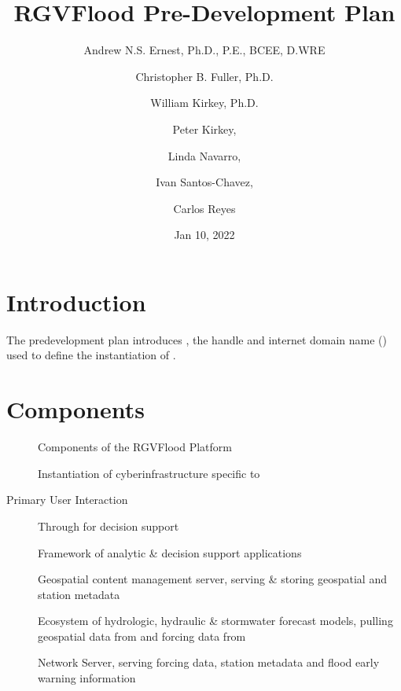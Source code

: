 \documentclass[letterpaper,12pt,english]{sphinxmanual}
\title{RGVFlood Pre-Development Plan}
\date{Jan 10, 2022}
\author{Andrew N.S. Ernest, Ph.D., P.E., BCEE, D.WRE \and Christopher B. Fuller, Ph.D. \and William Kirkey, Ph.D. \and Peter Kirkey, \and Linda Navarro, \and Ivan Santos-Chavez, \and Carlos Reyes}
\begin{document}
\pagestyle{empty}
\sphinxmaketitle
\pagestyle{plain}
\sphinxtableofcontents
\pagestyle{normal}
\label{\detokenize{predevelopment/index::doc}}



\chapter{Introduction}
\label{\detokenize{predevelopment/introduction:introduction}}\label{\detokenize{predevelopment/introduction::doc}}
\sphinxAtStartPar
The predevelopment plan introduces , the handle and internet domain name () used to define the  instantiation of .


\chapter{Components}
\label{\detokenize{predevelopment/components/index:components}}\label{\detokenize{predevelopment/components/index::doc}}
\begin{figure}[htbp]
\centering
\capstart

\noindent{}
\caption{Components of the RGVFlood Platform}\label{\detokenize{predevelopment/components/index:id1}}\end{figure}
\begin{description}
\item[{}] \leavevmode
\sphinxAtStartPar
Instantiation of  cyberinfrastructure specific to 

\item[{Primary User Interaction}] \leavevmode
\sphinxAtStartPar
Through  for decision support

\item[{}] \leavevmode
\sphinxAtStartPar
Framework of  analytic \& decision support applications

\item[{}] \leavevmode
\sphinxAtStartPar
Geospatial content management server, serving \& storing geospatial and  station metadata

\item[{}] \leavevmode
\sphinxAtStartPar
Ecosystem of hydrologic, hydraulic \& stormwater forecast models, pulling geospatial data from  and forcing data from 

\item[{}] \leavevmode
\sphinxAtStartPar
{} Network Server, serving forcing data, station metadata and flood early warning information

\end{description}
\end{document}
